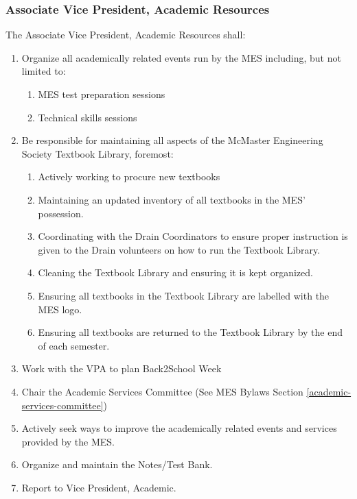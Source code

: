 \subsubsection{Associate Vice President, Academic Resources}
\label{associate-vice-president-academic-resources}
The Associate Vice President, Academic Resources shall:

\begin{enumerate}
\item
 Organize all academically related events run by the MES including, but
 not limited to:

 \begin{enumerate}
  \item
   MES test preparation sessions
  \item
   Technical skills sessions
 \end{enumerate}
\item
 Be responsible for maintaining all aspects of the McMaster Engineering
 Society Textbook Library, foremost:

 \begin{enumerate}
  \item
   Actively working to procure new textbooks
  \item
   Maintaining an updated inventory of all textbooks in the MES'
   possession.
  \item
   Coordinating with the Drain Coordinators to ensure proper
   instruction is given to the Drain volunteers on how to run the
   Textbook Library.
  \item
   Cleaning the Textbook Library and ensuring it is kept organized.
  \item
   Ensuring all textbooks in the Textbook Library are labelled with the
   MES logo.
  \item
   Ensuring all textbooks are returned to the Textbook Library by the
   end of each semester.
 \end{enumerate}
\item
 Work with the VPA to plan Back2School Week
\item
 Chair the Academic Services Committee (See MES Bylaws Section \ref{academic-services-committee})
\item
 Actively seek ways to improve the academically related events and
 services provided by the MES.
\item
 Organize and maintain the Notes/Test Bank.
\item
 Report to Vice President, Academic.
\end{enumerate}

